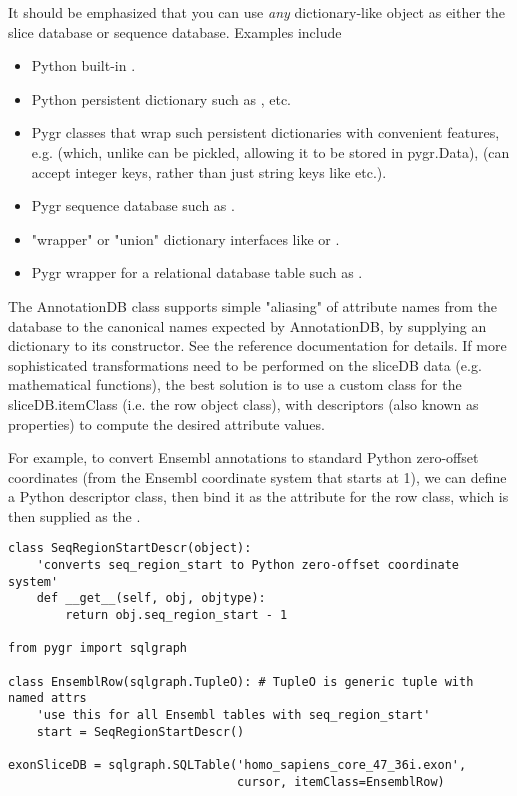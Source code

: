 \documentclass{howto}
\begin{document}
It should be emphasized that you can use {\em any} dictionary-like object
as either the slice database or sequence database.  Examples include
\begin{itemize}
\item Python built-in .

\item Python persistent dictionary such as ,  etc.

\item Pygr classes that wrap such persistent dictionaries with convenient
features, e.g.  (which, unlike  can be
pickled, allowing it to be stored in pygr.Data),  (can accept
integer keys, rather than just string keys like  etc.).

\item Pygr sequence database such as .

\item "wrapper" or "union" dictionary interfaces like 
or .

\item Pygr wrapper for a relational database table such as .
\end{itemize}

The AnnotationDB class supports
simple "aliasing" of attribute names from the database to the canonical
names expected by AnnotationDB, by supplying an  dictionary
to its constructor.  See the  reference documentation for
details.  If more sophisticated transformations need to be performed
on the sliceDB data (e.g. mathematical functions), the best solution is to
use a custom class for the sliceDB.itemClass (i.e. the row object class), 
with descriptors (also known as properties) to compute the desired attribute
values.

For example, to convert Ensembl annotations to standard Python zero-offset
coordinates (from the Ensembl coordinate system that starts at 1), we
can define a Python descriptor class, then bind it as the 
attribute for the row class, which is then supplied as the .
\begin{verbatim}
class SeqRegionStartDescr(object):
    'converts seq_region_start to Python zero-offset coordinate system'
    def __get__(self, obj, objtype):
        return obj.seq_region_start - 1

from pygr import sqlgraph

class EnsemblRow(sqlgraph.TupleO): # TupleO is generic tuple with named attrs
    'use this for all Ensembl tables with seq_region_start'
    start = SeqRegionStartDescr()

exonSliceDB = sqlgraph.SQLTable('homo_sapiens_core_47_36i.exon',
                                cursor, itemClass=EnsemblRow)
\end{verbatim}
\end{document}
